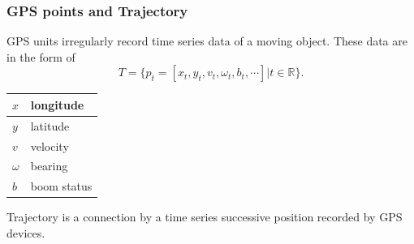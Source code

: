 \documentclass{beamer}
\begin{document}
\begin{frame}
	\frametitle{GPS points and Trajectory}
	
GPS units irregularly record time series data of a moving object. These data are in the form of
\begin{equation}
T=\{p_t=[x_t,y_t,v_t,\omega_t, b_t, \cdots] | t \in \mathbb{R} \}.
\end{equation}
\begin{table}[]
\centering
\begin{tabular}{|l|l|}
\hline
$x$     & longitude   \\ \hline
$y$     & latitude    \\ \hline
$v$      & velocity    \\ \hline
$\omega$ & bearing     \\ \hline
$b$     & boom status \\ \hline
\end{tabular}
\end{table}

Trajectory is a connection by a time series successive position recorded by GPS devices. 

\end{frame}
%
%
\end{document}

